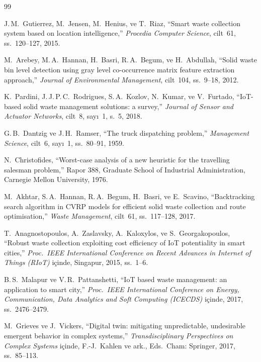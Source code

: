 \documentclass[12pt,a4paper]{report}
\begin{document}
\begin{itemize}[leftmargin=*]
\renewcommand{\bibname}{BIBLIOGRAPHY}
\begin{thebibliography}{99}

J.\,M.\ Gutierrez, M.\ Jensen, M.\ Henius, ve T.\ Riaz,
``Smart waste collection system based on location intelligence,''
\textit{Procedia Computer Science}, cilt~61, ss.\ 120--127, 2015.

M.\ Arebey, M.\,A.\ Hannan, H.\ Basri, R.\,A.\ Begum, ve H.\ Abdullah,
``Solid waste bin level detection using gray level co-occurrence matrix feature extraction approach,''
\textit{Journal of Environmental Management}, cilt~104, ss.\ 9--18, 2012.

K.\ Pardini, J.\,J.\,P.\,C.\ Rodrigues, S.\,A.\ Kozlov, N.\ Kumar, ve V.\ Furtado,
``IoT-based solid waste management solutions: a survey,''
\textit{Journal of Sensor and Actuator Networks}, cilt~8, sayı~1, s.~5, 2018.

G.\,B.\ Dantzig ve J.\,H.\ Ramser,
``The truck dispatching problem,''
\textit{Management Science}, cilt~6, sayı~1, ss.\ 80--91, 1959.

N.\ Christofides,
``Worst-case analysis of a new heuristic for the travelling salesman problem,''
Rapor 388, Graduate School of Industrial Administration, Carnegie Mellon University, 1976.

M.\ Akhtar, S.\,A.\ Hannan, R.\,A.\ Begum, H.\ Basri, ve E.\ Scavino,
``Backtracking search algorithm in CVRP models for efficient solid waste collection and route optimisation,''
\textit{Waste Management}, cilt~61, ss.\ 117--128, 2017.

T.\ Anagnostopoulos, A.\ Zaslavsky, A.\ Kaloxylos, ve S.\ Georgakopoulos,
``Robust waste collection exploiting cost efficiency of IoT potentiality in smart cities,''
\textit{Proc.\ IEEE International Conference on Recent Advances in Internet of Things (RIoT)} içinde,
Singapur, 2015, ss.\ 1--6.

B.\,S.\ Malapur ve V.\,R.\ Pattanshetti,
``IoT based waste management: an application to smart city,''
\textit{Proc.\ IEEE International Conference on Energy, Communication, Data Analytics and Soft Computing (ICECDS)} içinde,
2017, ss.\ 2476--2479.

M.\ Grieves ve J.\ Vickers,
``Digital twin: mitigating unpredictable, undesirable emergent behavior in complex systems,''
\textit{Transdisciplinary Perspectives on Complex Systems} içinde,
F.-J.\ Kahlen ve ark., Eds.\ Cham: Springer, 2017, ss.\ 85--113.


\end{thebibliography}
\end{itemize}
\end{document}
